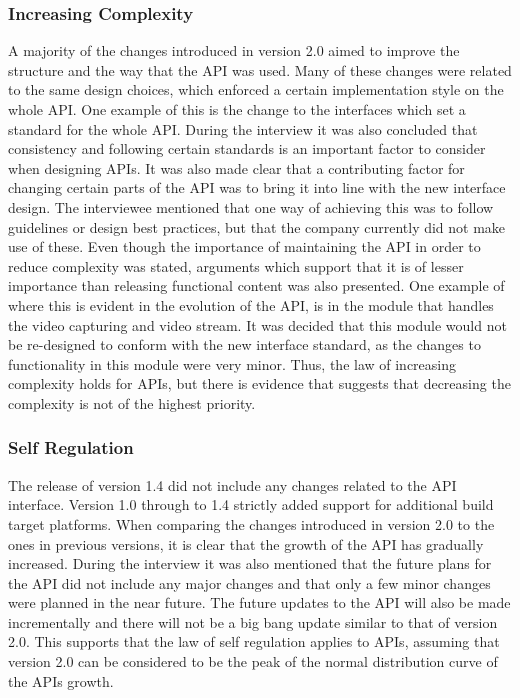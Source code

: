 \documentclass{sig-alternate}
\begin{document}
\subsubsection{Increasing Complexity} \label{sec:law2} %
A majority of the changes introduced in version 2.0 aimed to improve the structure and the way that the API was used. Many of these changes were related to the same design choices, which enforced a certain implementation style on the whole API. One example of this is the change to the interfaces which set a standard for the whole API. During the interview it was also concluded that consistency and following certain standards is an important factor to consider when designing APIs. It was also made clear that a contributing factor for changing certain parts of the API was to bring it into line with the new interface design. The interviewee mentioned that one way of achieving this was to follow guidelines or design best practices, but that the company currently did not make use of these. Even though the importance of maintaining the API in order to reduce complexity was stated, arguments which support that it is of lesser importance than releasing functional content was also presented. One example of where this is evident in the evolution of the API, is in the module that handles the video capturing and video stream. It was decided that this module would not be re-designed to conform with the new interface standard, as the changes to functionality in this module were very minor. Thus, the law of increasing complexity holds for APIs, but there is evidence that suggests that decreasing the complexity is not of the highest priority. 

\subsubsection{Self Regulation} \label{sec:law3} %
The release of version 1.4 did not include any changes related to the API interface. Version 1.0 through to 1.4 strictly added support for additional build target platforms. When comparing the changes introduced in version 2.0 to the ones in previous versions, it is clear that the growth of the API has gradually increased. During the interview it was also mentioned that the future plans for the API did not include any major changes and that only a few minor changes were planned in the near future. The future updates to the API will also be made incrementally and there will not be a big bang update similar to that of version 2.0. This supports that the law of self regulation applies to APIs, assuming that version 2.0 can be considered to be the peak of the normal distribution curve of the APIs growth. 
\end{document}
